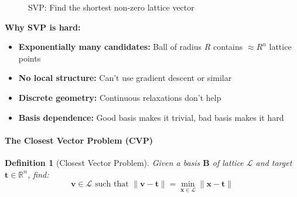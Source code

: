 \documentclass[11pt,a4paper]{article}
\newtheorem{definition}{Definition}
\begin{document}
\begin{figure}[h]
\centering
{}
\caption{SVP: Find the shortest non-zero lattice vector}
\end{figure}

\textbf{Why SVP is hard:}
\begin{itemize}
    \item \textbf{Exponentially many candidates:} Ball of radius $R$ contains $\approx R^n$ lattice points
    \item \textbf{No local structure:} Can't use gradient descent or similar
    \item \textbf{Discrete geometry:} Continuous relaxations don't help
    \item \textbf{Basis dependence:} Good basis makes it trivial, bad basis makes it hard
\end{itemize}

\paragraph{The Closest Vector Problem (CVP)}

\begin{definition}[Closest Vector Problem]
Given a basis $\mathbf{B}$ of lattice $\mathcal{L}$ and target $\mathbf{t} \in \mathbb{R}^n$, find:
$$\mathbf{v} \in \mathcal{L} \text{ such that } \|\mathbf{v} - \mathbf{t}\| = \min_{\mathbf{x} \in \mathcal{L}} \|\mathbf{x} - \mathbf{t}\|$$
\end{definition}
\end{document}
